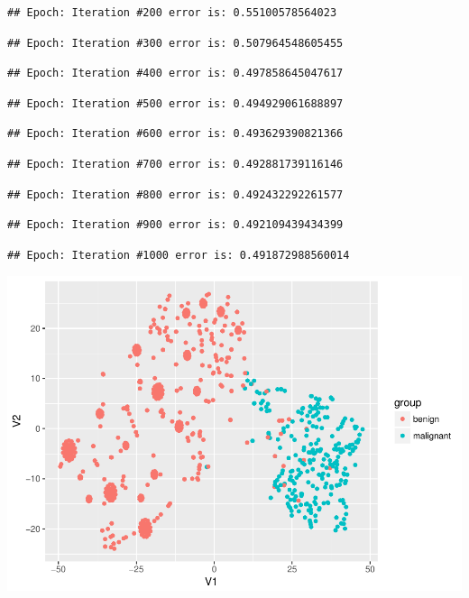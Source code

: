 \documentclass[]{article}
\begin{document}
\begin{verbatim}
## Epoch: Iteration #200 error is: 0.55100578564023
\end{verbatim}

\begin{verbatim}
## Epoch: Iteration #300 error is: 0.507964548605455
\end{verbatim}

\begin{verbatim}
## Epoch: Iteration #400 error is: 0.497858645047617
\end{verbatim}

\begin{verbatim}
## Epoch: Iteration #500 error is: 0.494929061688897
\end{verbatim}

\begin{verbatim}
## Epoch: Iteration #600 error is: 0.493629390821366
\end{verbatim}

\begin{verbatim}
## Epoch: Iteration #700 error is: 0.492881739116146
\end{verbatim}

\begin{verbatim}
## Epoch: Iteration #800 error is: 0.492432292261577
\end{verbatim}

\begin{verbatim}
## Epoch: Iteration #900 error is: 0.492109439434399
\end{verbatim}

\begin{verbatim}
## Epoch: Iteration #1000 error is: 0.491872988560014
\end{verbatim}

\includegraphics{webinar_code_files/figure-latex/tsne_plot-1.pdf}
\end{document}
